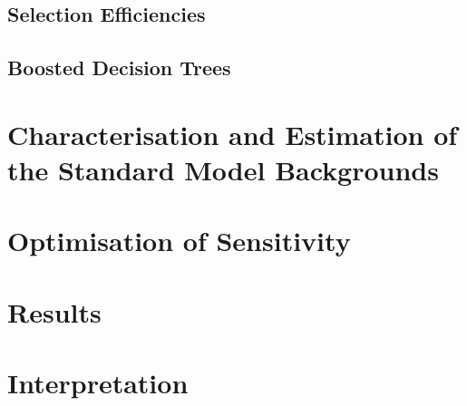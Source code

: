 \subsection{Selection Efficiencies}
\subsection{Boosted Decision Trees}

\section{Characterisation and Estimation of the Standard Model Backgrounds}

\section{Optimisation of Sensitivity}

\section{Results}

\section{Interpretation}
